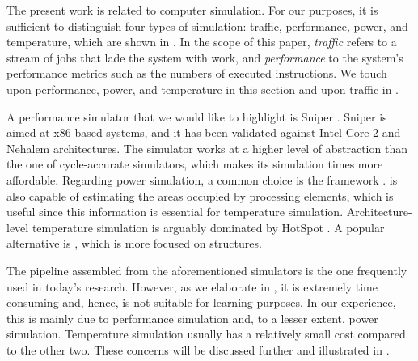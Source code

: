 The present work is related to computer simulation. For our purposes, it is
sufficient to distinguish four types of simulation: traffic, performance, power,
and temperature, which are shown in . In the scope of this
paper, \emph{traffic} refers to a stream of jobs that lade the system with work,
and \emph{performance} to the system's performance metrics such as the numbers
of executed instructions. We touch upon performance, power, and temperature in
this section and upon traffic in .

A performance simulator that we would like to highlight is Sniper
\cite{carlson2011}. Sniper is aimed at x86-based systems, and it has been
validated against Intel Core 2 and Nehalem architectures. The simulator works at
a higher level of abstraction than the one of cycle-accurate simulators, which
makes its simulation times more affordable. Regarding power simulation, a common
choice is the  framework \cite{li2009}.  is also capable of
estimating the areas occupied by processing elements, which is useful since this
information is essential for temperature simulation. Architecture-level
temperature simulation is arguably dominated by HotSpot \cite{skadron2004}. A
popular alternative is  \cite{sridhar2010}, which is more focused on
 structures.

The pipeline assembled from the aforementioned simulators is the one frequently
used in today's research. However, as we elaborate in , it is
extremely time consuming and, hence, is not suitable for learning purposes. In
our experience, this is mainly due to performance simulation and, to a lesser
extent, power simulation. Temperature simulation usually has a relatively small
cost compared to the other two. These concerns will be discussed further and
illustrated in .

